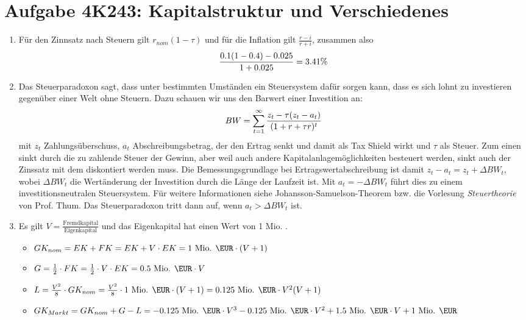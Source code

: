 \documentclass{article}
\begin{document}
	\section*{Aufgabe 4K243: Kapitalstruktur und Verschiedenes}
	\begin{enumerate}[label=(\alph*)]
		\item Für den Zinnsatz nach Steuern gilt $r_{nom}(1-\tau)$ und für die Inflation gilt $\frac{r-i}{r+i}$, zusammen also
		\begin{align}
			\frac{0.1(1-0.4) - 0.025}{1+0.025} = 3.41\%\notag
		\end{align}
		\item Das Steuerparadoxon sagt, dass unter bestimmten Umständen ein Steuersystem dafür sorgen kann, dass es sich lohnt zu investieren gegenüber einer Welt ohne Steuern. Dazu schauen wir uns den Barwert einer Investition an:
		\begin{align}
			BW = \sum_{t=1}^{\infty} \frac{z_t-\tau(z_t-a_t)}{(1+r+\tau r)^t} \notag
		\end{align}
		mit $z_t$ Zahlungsüberschuss, $a_t$ Abschreibungsbetrag, der den Ertrag senkt und damit als Tax Shield wirkt und $\tau$ als Steuer. Zum einen sinkt durch die zu zahlende Steuer der Gewinn, aber weil auch andere Kapitalanlagemöglichkeiten besteuert werden, sinkt auch der Zinssatz mit dem diskontiert werden muss. Die Bemessungsgrundlage bei Ertragswertabschreibung ist damit $z_t-a_t=z_t + \Delta BW_t$, wobei $\Delta BW_t$ die Wertänderung der Investition durch die Länge der Laufzeit ist. Mit $a_t=-\Delta BW_t$ führt dies zu einem investitionsneutralen Steuersystem. Für weitere Informationen siehe Johansson-Samuelson-Theorem bzw. die Vorlesung \textit{Steuertheorie} von Prof. Thum. Das Steuerparadoxon tritt dann auf, wenn $a_t>\Delta BW_t$ ist.
		\item Es gilt $V=\frac{\text{Fremdkapital}}{\text{Eigenkapital}}$ und das Eigenkapital hat einen Wert von 1 Mio. \EUR.
		\begin{itemize}
			\item $GK_{nom}=EK+FK=EK+V\cdot EK=\text{1 Mio. \EUR}\cdot (V+1)$
			\item $G=\frac{1}{2}\cdot FK=\frac{1}{2}\cdot V\cdot EK = \text{0.5 Mio. \EUR}\cdot V$
			\item $L=\frac{V^2}{8}\cdot GK_{nom}=\frac{V^2}{8}\cdot \text{1 Mio. \EUR}\cdot (V+1)=\text{0.125 Mio. \EUR}\cdot V^2(V+1)$
			\item $GK_{Markt}=GK_{nom}+G-L=-\text{0.125 Mio. \EUR}\cdot V^3-\text{0.125 Mio. \EUR}\cdot V^2+\text{1.5 Mio. \EUR}\cdot V+\text{1 Mio. \EUR}$
		\end{itemize}
		\begin{center}
\end{center}
\end{enumerate}
\end{document}
